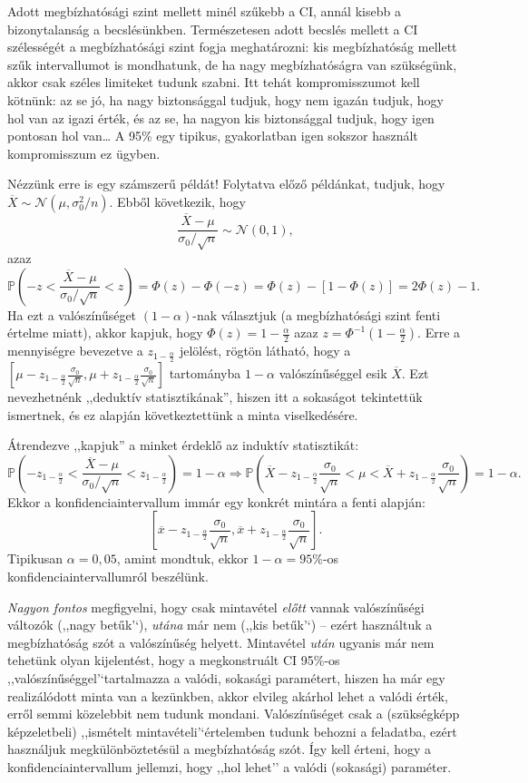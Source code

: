 \documentclass[]{book}
\begin{document}
Adott megbízhatósági szint mellett minél szűkebb a CI, annál kisebb a
bizonytalanság a becslésünkben. Természetesen adott becslés mellett a CI
szélességét a megbízhatósági szint fogja meghatározni: kis megbízhatóság
mellett szűk intervallumot is mondhatunk, de ha nagy megbízhatóságra van
szükségünk, akkor csak széles limiteket tudunk szabni. Itt tehát
kompromisszumot kell kötnünk: az se jó, ha nagy biztonsággal tudjuk,
hogy nem igazán tudjuk, hogy hol van az igazi érték, és az se, ha nagyon
kis biztonsággal tudjuk, hogy igen pontosan hol van\dots{} A 95\% egy
tipikus, gyakorlatban igen sokszor használt kompromisszum ez ügyben.

Nézzünk erre is egy számszerű példát! Folytatva előző példánkat, tudjuk,
hogy \(\overline{X} \sim \mathcal{N}\left(\mu,\sigma_0^2/n\right)\).
Ebből következik, hogy \[
    \frac{\overline{X}-\mu}{\sigma_0/\sqrt{n}}\sim\mathcal{N}\left(0,1\right),
\] azaz \[
    \mathbb{P}\left(-z<\frac{\overline{X}-\mu}{\sigma_0/\sqrt{n}}<z\right)=\Phi\left(z\right)-\Phi\left(-z\right)=\Phi\left(z\right)-\left[1-\Phi\left(z\right)\right]=2\Phi\left(z\right)-1.
\] Ha ezt a valószínűséget \(\left(1-\alpha\right)\)-nak választjuk (a
megbízhatósági szint fenti értelme miatt), akkor kapjuk, hogy
\(\Phi\left(z\right)=1-\frac{\alpha}{2}\) azaz
\(z=\Phi^{-1}\left(1-\frac{\alpha}{2}\right)\). Erre a mennyiségre
bevezetve a \(z_{1-\frac{\alpha}{2}}\) jelölést, rögtön látható, hogy a
\(\left[\mu-z_{1-\frac{\alpha}{2}}\frac{\sigma_0}{\sqrt{n}},\mu+z_{1-\frac{\alpha}{2}}\frac{\sigma_0}{\sqrt{n}}\right]\)
tartományba \(1-\alpha\) valószínűséggel esik \(\overline{X}\). Ezt
nevezhetnénk ,,deduktív statisztikának'', hiszen itt a sokaságot
tekintettük ismertnek, és ez alapján következtettünk a minta
viselkedésére.

Átrendezve ,,kapjuk'' a minket érdeklő az induktív statisztikát: \[
    \mathbb{P}\left(-z_{1-\frac{\alpha}{2}}<\frac{\overline{X}-\mu}{\sigma_0/\sqrt{n}}<z_{1-\frac{\alpha}{2}}\right)=1-\alpha \Rightarrow \mathbb{P}\left(\overline{X}-z_{1-\frac{\alpha}{2}}\frac{\sigma_0}{\sqrt{n}}<\mu<\overline{X}+z_{1-\frac{\alpha}{2}}\frac{\sigma_0}{\sqrt{n}}\right)=1-\alpha.
\] Ekkor a konfidenciaintervallum immár egy konkrét mintára a fenti
alapján: \[
    \left[\overline{x}-z_{1-\frac{\alpha}{2}}\frac{\sigma_0}{\sqrt{n}},\overline{x}+z_{1-\frac{\alpha}{2}}\frac{\sigma_0}{\sqrt{n}}\right].
\] Tipikusan \(\alpha=0,\!05\), amint mondtuk, ekkor
\(1-\alpha=95\)\%-os konfidenciaintervallumról beszélünk.

\emph{Nagyon fontos} megfigyelni, hogy csak mintavétel \emph{előtt}
vannak valószínűségi változók (,,nagy betűk'`), \emph{utána} már nem
(,,kis betűk'`) -- ezért használtuk a megbízhatóság szót a valószínűség
helyett. Mintavétel \emph{után} ugyanis már nem tehetünk olyan
kijelentést, hogy a megkonstruált CI 95\%-os
,,valószínűséggel'`tartalmazza a valódi, sokasági paramétert, hiszen ha
már egy realizálódott minta van a kezünkben, akkor elvileg akárhol lehet
a valódi érték, erről semmi közelebbit nem tudunk mondani.
Valószínűséget csak a (szükségképp képzeletbeli) ,,ismételt
mintavételi'`értelemben tudunk behozni a feladatba, ezért használjuk
megkülönböztetésül a megbízhatóság szót. Így kell érteni, hogy a
konfidenciaintervallum jellemzi, hogy ,,hol lehet'' a valódi (sokasági)
paraméter.
\end{document}

